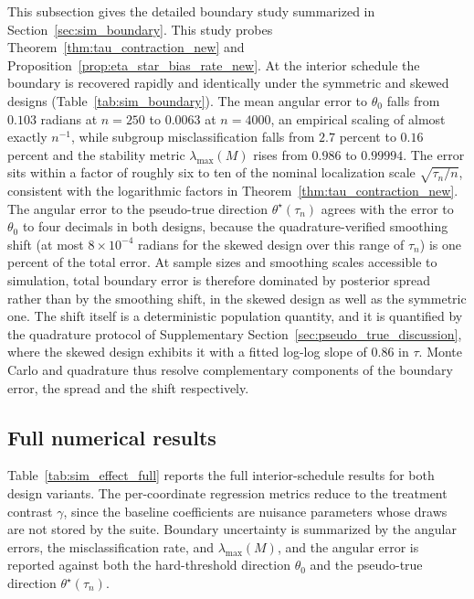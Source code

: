 \documentclass[11pt]{article}
\theoremstyle{definition}
\theoremstyle{plain}
\begin{document}
This subsection gives the detailed boundary study summarized in Section~\ref{sec:sim_boundary}. This study probes Theorem~\ref{thm:tau_contraction_new} and Proposition~\ref{prop:eta_star_bias_rate_new}. At the interior schedule the boundary is recovered rapidly and identically under the symmetric and skewed designs (Table~\ref{tab:sim_boundary}). The mean angular error to $\theta_0$ falls from $0.103$ radians at $n=250$ to $0.0063$ at $n=4000$, an empirical scaling of almost exactly $n^{-1}$, while subgroup misclassification falls from $2.7$ percent to $0.16$ percent and the stability metric $\lambda_{\max}(M)$ rises from $0.986$ to $0.99994$. The error sits within a factor of roughly six to ten of the nominal localization scale $\sqrt{\tau_n/n}$, consistent with the logarithmic factors in Theorem~\ref{thm:tau_contraction_new}. The angular error to the pseudo-true direction $\theta^\star(\tau_n)$ agrees with the error to $\theta_0$ to four decimals in both designs, because the quadrature-verified smoothing shift (at most $8\times10^{-4}$ radians for the skewed design over this range of $\tau_n$) is one percent of the total error. At sample sizes and smoothing scales accessible to simulation, total boundary error is therefore dominated by posterior spread rather than by the smoothing shift, in the skewed design as well as the symmetric one. The shift itself is a deterministic population quantity, and it is quantified by the quadrature protocol of Supplementary Section~\ref{sec:pseudo_true_discussion}, where the skewed design exhibits it with a fitted log-log slope of $0.86$ in $\tau$. Monte Carlo and quadrature thus resolve complementary components of the boundary error, the spread and the shift respectively.

\subsection{Full numerical results}
\label{sec:numerical_results_sim}

Table~\ref{tab:sim_effect_full} reports the full interior-schedule results for both design variants. The per-coordinate regression metrics reduce to the treatment contrast $\gamma$, since the baseline coefficients are nuisance parameters whose draws are not stored by the suite. Boundary uncertainty is summarized by the angular errors, the misclassification rate, and $\lambda_{\max}(M)$, and the angular error is reported against both the hard-threshold direction $\theta_0$ and the pseudo-true direction $\theta^\star(\tau_n)$.
\end{document}
